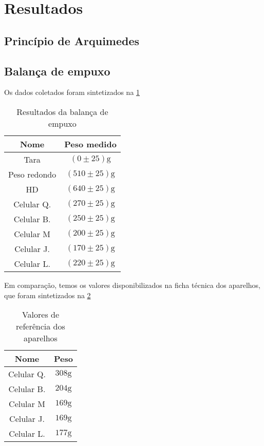 \section{Resultados}
\subsection{Princípio de Arquimedes}


\subsection{Balança de empuxo}

Os dados coletados foram sintetizados na \cref{tab1}
\begin{table}[H]
    \caption{Resultados da balança de empuxo}
    \label{tab1}
    \begin{center}
        \begin{tabular}{c c}
            \hline
            Nome & Peso medido \\
            \hline
            Tara & \( (0 \pm 25) \unit{\gram} \)\\
            Peso redondo & \( (510 \pm 25) \unit{\gram} \)\\
            HD & \( (640 \pm 25) \unit{\gram} \)\\
            Celular Q. & \( (270 \pm 25) \unit{\gram} \)\\
            Celular B. & \( (250 \pm 25) \unit{\gram} \)\\
            Celular M & \( (200 \pm 25) \unit{\gram} \)\\
            Celular J. & \( (170 \pm 25) \unit{\gram} \)\\
            Celular L. & \( (220 \pm 25) \unit{\gram} \)\\
            \hline
    \end{tabular}
    \end{center}
\end{table}
Em comparação, temos os valores disponibilizados na ficha técnica dos aparelhos,
que foram sintetizados na \cref{tab2}
\begin{table}[H]
    \caption{Valores de referência dos aparelhos}
    \label{tab2}
    \begin{center}
        \begin{tabular}{c c}
            \hline
            Nome & Peso \\
            \hline
            Celular Q. & \( 308 \unit{\gram} \)\\
            Celular B. & \( 204 \unit{\gram} \)\\
            Celular M &  \( 169 \unit{\gram} \)\\
            Celular J. & \( 169 \unit{\gram} \)\\
            Celular L. & \( 177 \unit{\gram} \)\\
            \hline
    \end{tabular}
    \end{center}
\end{table}


